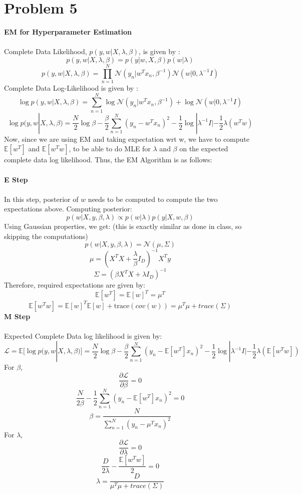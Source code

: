 \documentclass{article}
\begin{document}
\section*{Problem 5}
\textbf{EM for Hyperparameter Estimation} \\ \\
Complete Data Likelihood, $p(y,w|X,\lambda, \beta) $, is given by :
$$p(y,w|X,\lambda, \beta) = p(y|w,X,\beta)p(w|\lambda)$$
$$p(y,w|X,\lambda, \beta) = \prod_{n=1}^N \mathcal{N}(y_n|w^Tx_n, \beta^{-1})\mathcal{N}(w|0,\lambda^{-1}I)$$
Complete Data Log-Likelihood is given by :
$$\log p(y,w|X,\lambda, \beta) = \sum_{n=1}^N \log \mathcal{N}(y_n|w^Tx_n, \beta^{-1})+\log \mathcal{N}(w|0,\lambda^{-1}I)$$
$$\log p(y,w|X,\lambda, \beta) = \frac{N}{2}\log \beta - \frac{\beta}{2}\sum_{n=1}^N(y_n-w^Tx_n)^2 - \frac{1}{2}\log |\lambda^{-1}I| -\frac{1}{2}\lambda(w^Tw)$$
Now, since we are using EM and taking expectation wrt w, we have to compute $\mathds{E}[w^T]$ and $\mathds{E}[w^Tw]$, to be able to do MLE for $\lambda$ and $\beta$ on the expected complete data log likelihood. Thus, the EM Algorithm is as follows: \\ \\
\textbf{E Step} \\ \\
In this step, posterior of $w$ needs to be computed to compute the two expectations above. Computing posterior:
$$p(w|X,y,\beta,\lambda) \propto p(w|\lambda)p(y|X,w,\beta)$$
Using Gaussian properties, we get: (this is exactly similar as done in class, so skipping the computations)
$$p(w|X,y,\beta,\lambda) = \mathcal{N}(\mu, \Sigma)$$
$$\mu = (X^TX + \frac{\lambda}{\beta}I_D)^{-1}X^Ty$$ 
$$\Sigma = (\beta X^TX + \lambda I_D)^{-1}$$
Therefore, required expectations are given by:
$$\mathds{E}[w^T] = \mathds{E}[w]^T =\mu^T$$
$$\mathds{E}[w^Tw] = \mathds{E}[w]^T\mathds{E}[w]+\text{trace}(cov(w)) = \mu^T\mu + trace(\Sigma)$$
\textbf{M Step} \\ \\
Expected Complete Data log likelihood is given by:
$$\mathcal{L} =  \mathds{E}[\log p(y,w|X,\lambda, \beta)] = \frac{N}{2}\log \beta - \frac{\beta}{2}\sum_{n=1}^N(y_n-\mathds{E}[w^T]x_n)^2 - \frac{1}{2}\log |\lambda^{-1}I| -\frac{1}{2}\lambda(\mathds{E}[w^Tw])$$
For $\beta$, 
$$\frac{\partial \mathcal{L}}{\partial \beta} = 0$$
$$\frac{N}{2\beta} - \frac{1}{2}\sum_{n=1}^N(y_n-\mathds{E}[w^T]x_n)^2 = 0$$
$$\beta = \frac{N}{\sum_{n=1}^N(y_n-\mu^Tx_n)^2}$$
For $\lambda$,
$$\frac{\partial \mathcal{L}}{\partial \lambda} = 0$$
$$\frac{D}{2\lambda} - \frac{\mathds{E}[w^Tw]}{2} = 0$$
$$\lambda = \frac{D}{ \mu^T\mu + trace(\Sigma)}$$
\end{document}
